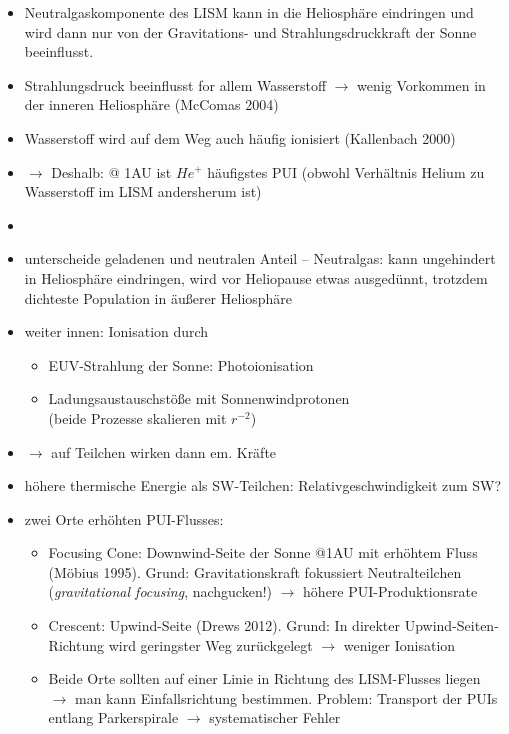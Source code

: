 \documentclass[]{article}
\begin{document}
\begin{itemize}
	\item Neutralgaskomponente des LISM kann in die Heliosphäre eindringen und wird dann nur von der Gravitations- und Strahlungsdruckkraft der Sonne beeinflusst.
	\item Strahlungsdruck beeinflusst for allem Wasserstoff $\rightarrow$ wenig Vorkommen in der inneren Heliosphäre (McComas 2004)
	\item Wasserstoff wird auf dem Weg auch häufig ionisiert (Kallenbach 2000)
	\item $\rightarrow$ Deshalb: @ 1AU ist $He^+$ häufigstes PUI (obwohl Verhältnis Helium zu Wasserstoff im LISM andersherum ist)
	\item
	\item unterscheide geladenen und neutralen Anteil -- Neutralgas: kann ungehindert in Heliosphäre eindringen, wird vor Heliopause etwas ausgedünnt, trotzdem dichteste Population in äußerer Heliosphäre
	\item weiter innen: Ionisation durch 
	\begin{itemize}
		\item EUV-Strahlung der Sonne: Photoionisation
		\item Ladungsaustauschstöße mit Sonnenwindprotonen \\
		(beide Prozesse skalieren mit $r^{-2}$)
	\end{itemize}
	\item $\rightarrow$ auf Teilchen wirken dann em. Kräfte
	\item höhere thermische Energie als SW-Teilchen: Relativgeschwindigkeit zum SW?
	\item zwei Orte erhöhten PUI-Flusses:
	\begin{itemize}
		\item Focusing Cone: Downwind-Seite der Sonne @1AU mit erhöhtem Fluss (Möbius 1995). Grund: Gravitationskraft fokussiert Neutralteilchen (\textit{gravitational focusing}, nachgucken!) $\rightarrow$ höhere PUI-Produktionsrate
		\item Crescent: Upwind-Seite (Drews 2012). Grund: In direkter Upwind-Seiten-Richtung wird geringster Weg zurückgelegt $\rightarrow$ weniger Ionisation
		\item Beide Orte sollten auf einer Linie in Richtung des LISM-Flusses liegen $\rightarrow$ man kann Einfallsrichtung bestimmen. Problem: Transport der PUIs entlang Parkerspirale $\rightarrow$ systematischer Fehler 
	\end{itemize}
\end{itemize}
%
%
%
\end{document}
